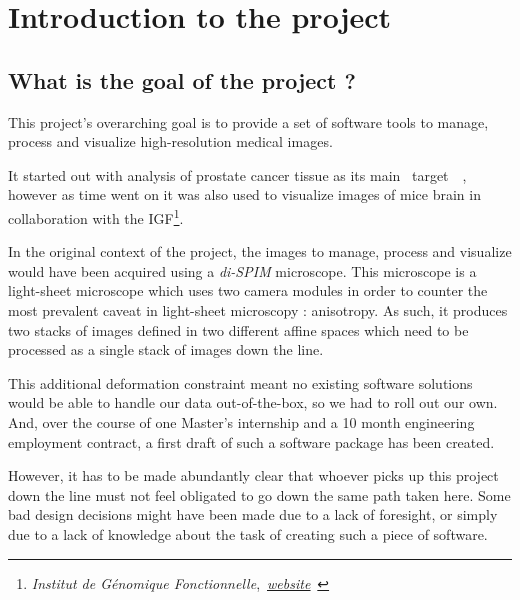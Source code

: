 \chapter{Introduction to the project}\label{text:01_intro}

\begin{comment}
	This section will include :
		- Why this program was created
		- What problems does it tackle / what are its features (very quickly)
		- How to read this manual ?
		- A few definitions
			- notably, the use of certain terms (dataset = 1/multiple 3D image(s))
\end{comment}

\section{What is the goal of the project ?}\label{text:01_intro:00_project}
{
	This project's overarching goal is to provide a set of software tools to manage, process and visualize high-resolution medical images.\par
	It started out with analysis of prostate cancer tissue as its main \guillemotleft~target~\guillemotright~, however as time went on it was also used to visualize images of mice brain in collaboration with the IGF\footnote{\textit{Institut de Génomique Fonctionnelle},~\href{https://www.igf.cnrs.fr/index.php/en/}{\underline{\textit{website}}}~}.

	\vspace{\baselineskip}

	In the original context of the project, the images to manage, process and visualize would have been acquired using a \textit{di-SPIM} microscope. This microscope is a light-sheet microscope which uses two camera modules in order to counter the most prevalent caveat in light-sheet microscopy : anisotropy. As such, it produces two stacks of images defined in two different affine spaces which need to be processed as a single stack of images down the line.\par
	This additional deformation constraint meant no existing software solutions would be able to handle our data out-of-the-box, so we had to roll out our own. And, over the course of one Master's internship and a 10 month engineering employment contract, a first draft of such a software package has been created.

	\vspace{\baselineskip}

	However, it has to be made abundantly clear that whoever picks up this project down the line must not feel obligated to go down the same path taken here. Some bad design decisions might have been made due to a lack of foresight, or simply due to a lack of knowledge about the task of creating such a piece of software.

}

